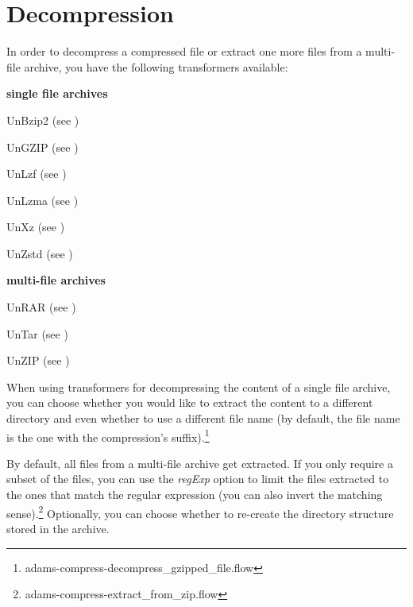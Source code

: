 \documentclass[a4paper]{book}
\begin{document}
\chapter{Decompression}
In order to decompress a compressed file or extract one more files from a
multi-file archive, you have the following transformers available:
\begin{tight_itemize}
	\item \textbf{single file archives}
	\begin{tight_itemize}
		\item UnBzip2 (see \cite{bzip2})
		\item UnGZIP (see \cite{gzip})
		\item UnLzf (see \cite{lzf})
		\item UnLzma (see \cite{lzma})
		\item UnXz (see \cite{xz})
		\item UnZstd (see \cite{zstd})
	\end{tight_itemize}
	\item \textbf{multi-file archives}
	\begin{tight_itemize}
		\item UnRAR (see \cite{rar})
		\item UnTar (see \cite{tar})
		\item UnZIP (see \cite{zip})
	\end{tight_itemize}
\end{tight_itemize}

When using transformers for decompressing the content of a single file archive,
you can choose whether you would like to extract the content to a different 
directory and even whether to use a different file name (by default, the file name
is the one with the compression's suffix).\footnote{adams-compress-decompress\_gzipped\_file.flow}

By default, all files from a multi-file archive get extracted. If you only 
require a subset of the files, you can use the \textit{regExp} option to
limit the files extracted to the ones that match the regular expression (you
can also invert the matching sense).\footnote{adams-compress-extract\_from\_zip.flow}
Optionally, you can choose whether to re-create the directory structure 
stored in the archive.


\end{document}
